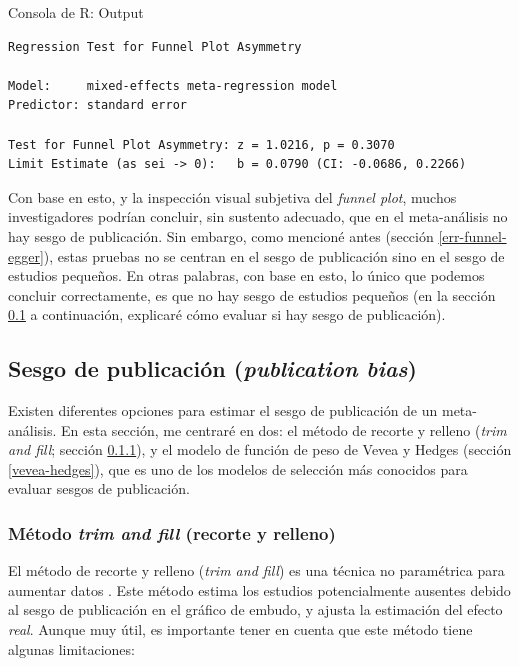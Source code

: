 \documentclass[
  bookmarksnumbered]{article}
\begin{document}
\begin{ROut}{Consola de R: Output~\thetcbcounter}
                \begin{footnotesize}
                \begin{verbatim} 
Regression Test for Funnel Plot Asymmetry

Model:     mixed-effects meta-regression model
Predictor: standard error

Test for Funnel Plot Asymmetry: z = 1.0216, p = 0.3070
Limit Estimate (as sei -> 0):   b = 0.0790 (CI: -0.0686, 0.2266)
 \end{verbatim}
                \end{footnotesize}
                \end{ROut}

Con base en esto, y la inspección visual subjetiva del \emph{funnel plot}, muchos investigadores podrían concluir, sin sustento adecuado, que en el meta-análisis no hay sesgo de publicación. Sin embargo, como mencioné antes (sección \ref{err-funnel-egger}), estas pruebas no se centran en el sesgo de publicación sino en el sesgo de estudios pequeños. En otras palabras, con base en esto, lo único que podemos concluir correctamente, es que no hay sesgo de estudios pequeños (en la sección \ref{sesgo-pub} a continuación, explicaré cómo evaluar si hay sesgo de publicación).

\hypertarget{sesgo-pub}{%
\subsection{\texorpdfstring{Sesgo de publicación (\emph{publication bias})}{Sesgo de publicación (publication bias)}}\label{sesgo-pub}}

Existen diferentes opciones para estimar el sesgo de publicación de un meta-análisis. En esta sección, me centraré en dos: el método de recorte y relleno (\emph{trim and fill}; sección \ref{trim-fill}), y el modelo de función de peso de Vevea y Hedges (sección \ref{vevea-hedges}), que es uno de los modelos de selección más conocidos para evaluar sesgos de publicación.

\hypertarget{trim-fill}{%
\subsubsection{\texorpdfstring{Método \emph{trim and fill} (recorte y relleno)}{Método trim and fill (recorte y relleno)}}\label{trim-fill}}

El método de recorte y relleno (\emph{trim and fill}) es una técnica no paramétrica para aumentar datos \autocites{duvalNonparametricTrimFill2000,duvalTrimFillSimple2000}[ver también][]{duvalTrimFillMethod2005}. Este método estima los estudios potencialmente ausentes debido al sesgo de publicación en el gráfico de embudo, y ajusta la estimación del efecto \emph{real}. Aunque muy útil, es importante tener en cuenta que este método tiene algunas limitaciones:
\end{document}
